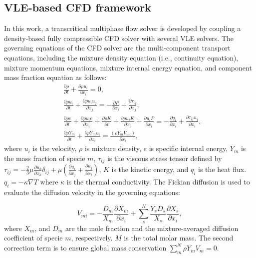\subsection{VLE-based CFD framework}
\label{sec:model:cfd}
In this work, a transcritical multiphase flow solver is developed by coupling a density-based fully compressible CFD solver with several VLE solvers. 
The governing equations of the CFD solver are the multi-component transport equations, including the mixture density equation (i.e., continuity equation), mixture momentum equations, mixture internal energy equation, and 
component mass fraction equation as follows:
\begin{align}
 &\frac{\partial \rho}{\partial t}+\frac{\partial \rho u_i}{\partial x_i}=0 \label{Gc},\\
 &\frac{\partial \rho u_i}{\partial t}+\frac{\partial \rho u_i u_j}{\partial x_j}=-\frac{\partial P}{\partial x_i}+\frac{\partial \tau_{ij}}{\partial x_j} \label{Gm},\\
 &\frac{\partial \rho e}{\partial t}+\frac{\partial \rho u_i e}{\partial x_i}+\frac{\partial \rho K}{\partial t}+\frac{\partial \rho u_i K}{\partial x_i}+\frac{\partial  u_i P}{\partial x_i}=-\frac{\partial q_i}{\partial x_i} +\frac{\partial \tau_{ij}u_j}{\partial x_i},\\
  &\frac{\partial \rho Y_m}{\partial t}+\frac{\partial \rho Y_m u_i}{\partial x_i}=\frac{\left(\rho Y_m V_{mi}\right)}{\partial x_i},
\end{align}
where $u_i$ is the velocity, $\rho$ is mixture density, $e$ is specific internal energy, $Y_m$ is the mass fraction of specie $m$, $\tau_{ij}$ is the viscous stress tensor defined by $ \tau_{ij} = -\frac{2}{3}\mu\frac{\partial u_k}{\partial x_k}\delta_{ij} + \mu \left( \frac{\partial u_i}{\partial x_j} +\frac{\partial u_j}{\partial x_i}\right) $, $K$ is the kinetic energy, and $q_i$ is the heat flux. $q_i = -\kappa \nabla  T$ where $\kappa$ is the thermal conductivity. 
The Fickian diffusion is used to evaluate the diffusion velocity in the governing equations:

$$ V_{mi} = -\frac{D_m}{X_m}\frac{\partial X_m} {\partial x_i} + \sum^{N}_{s}\frac{Y_s D_s}{X_s}\frac{\partial X_s} {\partial x_i},$$
where $X_m$, and $D_m$ are the mole fraction and the mixture-averaged diffusion coefficient of specie $m$, respectively. $M$ is the total molar mass. The second correction term is to ensure global mass conservation $\sum^{N}_{m} \rho Y_m V_m = 0$.


